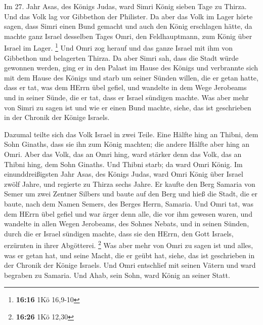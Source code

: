  Im 27. Jahr Asas, des Königs Judas, ward Simri König
sieben Tage zu Thirza. Und das Volk lag vor Gibbethon der Philister.
 Da aber das Volk im Lager hörte sagen, dass Simri einen
Bund gemacht und auch den König erschlagen hätte, da machte ganz Israel
desselben Tages Omri, den Feldhauptmann, zum König über Israel im Lager.
\footnote{\textbf{16:16} 1Kö 16,9-10}  Und Omri zog herauf
und das ganze Israel mit ihm von Gibbethon und belagerten Thirza.
 Da aber Simri sah, dass die Stadt würde gewonnen werden,
ging er in den Palast im Hause des Königs und verbrannte sich mit dem
Hause des Königs und starb  um seiner Sünden willen, die er
getan hatte, dass er tat, was dem HErrn übel gefiel, und wandelte in dem
Wege Jerobeams und in seiner Sünde, die er tat, dass er Israel sündigen
machte.  Was aber mehr von Simri zu sagen ist und wie er
einen Bund machte, siehe, das ist geschrieben in der Chronik der Könige
Israels.

 Dazumal teilte sich das Volk Israel in zwei Teile. Eine
Hälfte hing an Thibni, dem Sohn Ginaths, dass sie ihn zum König machten;
die andere Hälfte aber hing an Omri.  Aber das Volk, das an
Omri hing, ward stärker denn das Volk, das an Thibni hing, dem Sohn
Ginaths. Und Thibni starb; da ward Omri König.  Im
einunddreißigsten Jahr Asas, des Königs Judas, ward Omri König über
Israel zwölf Jahre, und regierte zu Thirza sechs Jahre.  Er
kaufte den Berg Samaria von Semer um zwei Zentner Silbers und baute auf
den Berg und hieß die Stadt, die er baute, nach dem Namen Semers, des
Berges Herrn, Samaria.  Und Omri tat, was dem HErrn übel
gefiel und war ärger denn alle, die vor ihm gewesen waren, 
und wandelte in allen Wegen Jerobeams, des Sohnes Nebats, und in seinen
Sünden, durch die er Israel sündigen machte, dass sie den HErrn, den
Gott Israels, erzürnten in ihrer Abgötterei. \footnote{\textbf{16:26}
  1Kö 12,30}  Was aber mehr von Omri zu sagen ist und
alles, was er getan hat, und seine Macht, die er geübt hat, siehe, das
ist geschrieben in der Chronik der Könige Israels.  Und
Omri entschlief mit seinen Vätern und ward begraben zu Samaria. Und
Ahab, sein Sohn, ward König an seiner Statt.

